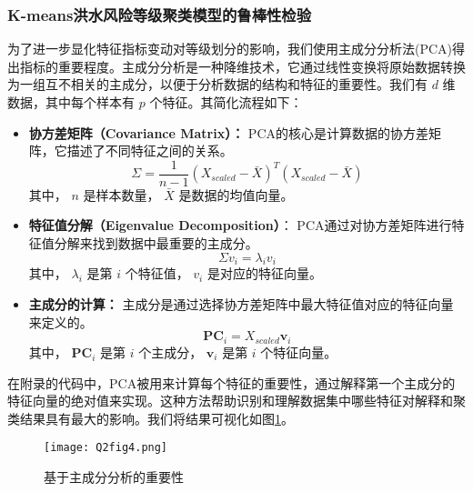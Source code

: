 \documentclass[withoutpreface,bwprint]{cumcmthesis} %
\begin{document}
\subsubsection{K-means洪水风险等级聚类模型的鲁棒性检验}
为了进一步显化特征指标变动对等级划分的影响，我们使用主成分分析法(PCA)得出指标的重要程度。主成分分析是一种降维技术，它通过线性变换将原始数据转换为一组互不相关的主成分，以便于分析数据的结构和特征的重要性。我们有 \( d \) 维数据，其中每个样本有 \( p \) 个特征。其简化流程如下：
\begin{itemize}
	\item \textbf{协方差矩阵（Covariance Matrix）：}
	PCA的核心是计算数据的协方差矩阵，它描述了不同特征之间的关系。
	\begin{equation}
	\Sigma = \frac{1}{n-1} (X_{scaled} - \bar{X})^T (X_{scaled} - \bar{X})
	\end{equation}
	其中， \( n \) 是样本数量， \( \bar{X} \) 是数据的均值向量。
	\item \textbf{特征值分解（Eigenvalue Decomposition）}：
	PCA通过对协方差矩阵进行特征值分解来找到数据中最重要的主成分。
	\begin{equation}
	\Sigma v_i = \lambda_i v_i
	\end{equation}
	其中， \( \lambda_i \) 是第 \( i \) 个特征值， \( v_i \) 是对应的特征向量。
	\item \textbf{主成分的计算：}
	主成分是通过选择协方差矩阵中最大特征值对应的特征向量来定义的。
	\begin{equation}
	\mathbf{PC}_i = X_{scaled} \mathbf{v}_i
	\end{equation}
	其中， \( \mathbf{PC}_i \) 是第 \( i \) 个主成分， \( \mathbf{v}_i \) 是第 \( i \) 个特征向量。
	
\end{itemize}

在附录的代码中，PCA被用来计算每个特征的重要性，通过解释第一个主成分的特征向量的绝对值来实现。这种方法帮助识别和理解数据集中哪些特征对解释和聚类结果具有最大的影响。我们将结果可视化如图\ref{Q2fig4.png}。

\begin{figure}[htbp]
	\centering
	\texttt{[image: Q2fig4.png]}
	\caption{基于主成分分析的重要性}
	\label{Q2fig4.png}
\end{figure}
\end{document}
